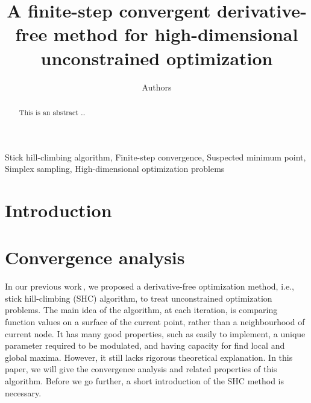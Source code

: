 \documentclass[preprint,12pt]{elsarticle}
\begin{document}
\begin{frontmatter}

\title{A finite-step convergent derivative-free method for
high-dimensional unconstrained optimization}




\author{Authors }


%

\begin{abstract}
This is an abstract \dots
\end{abstract}

\begin{keyword}
Stick hill-climbing algorithm, Finite-step convergence,
Suspected minimum point, Simplex sampling, 
High-dimensional optimization problems
\end{keyword}

\end{frontmatter}


\section{Introduction}


\section{Convergence analysis}

In our previous work\,\cite{huang2017hill}, we proposed a
derivative-free optimization method, i.e., stick hill-climbing
(SHC) algorithm, to treat unconstrained optimization problems. 
The main idea of the algorithm, at each iteration, is
comparing function values on a surface of the current point,
rather than a neighbourhood of current node. 
It has many good properties, such as easily to implement,
a unique parameter required to be modulated, and having capacity
for find local and global maxima. However, it still lacks rigorous
theoretical explanation. 
In this paper, we will give the convergence analysis and related
properties of this algorithm.
Before we go further, a short introduction of the
SHC method is necessary.
\end{document}
